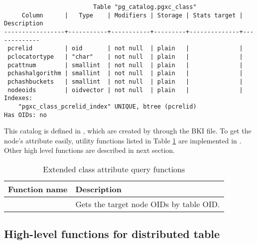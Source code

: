   \begin{lstlisting}
                         Table "pg_catalog.pgxc_class"
     Column      |   Type    | Modifiers | Storage | Stats target | Description 
-----------------+-----------+-----------+---------+--------------+-------------
 pcrelid         | oid       | not null  | plain   |              | 
 pclocatortype   | "char"    | not null  | plain   |              | 
 pcattnum        | smallint  | not null  | plain   |              | 
 pchashalgorithm | smallint  | not null  | plain   |              | 
 pchashbuckets   | smallint  | not null  | plain   |              | 
 nodeoids        | oidvector | not null  | plain   |              | 
Indexes:
    "pgxc_class_pcrelid_index" UNIQUE, btree (pcrelid)
Has OIDs: no
  \end{lstlisting}
  
  This catalog is defined in , 
  which are created by  through the BKI file.
  To get the node's attribute easily, utility functions listed in Table \ref{tab:xcclsattrfunc}
  are implemented in .
  Other high level functions are described in next section.
  
  \begin{table}[htp]
	  \begin{center}
		  \caption{\label{tab:xcclsattrfunc}Extended class attribute query functions}
		  \begin{tabular}{lp{0.5\hsize}} \hline
			  Function name & Description \\ \hline
			  \file{get_pgxc_classnodes()} & Gets the target node OIDs by table OID. \\
			  \hline
		  \end{tabular}
	  \end{center}
  \end{table}




\subsection{High-level functions for distributed table}



